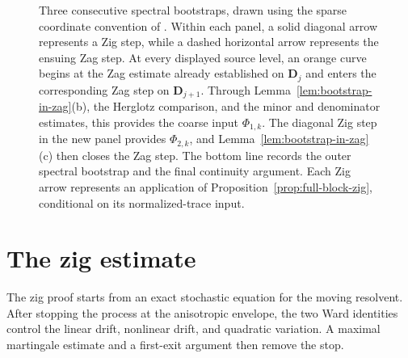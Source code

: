 \documentclass[11pt,reqno]{amsart}
\def\bD{\mathbf{D}}
\theoremstyle{definition}
\numberwithin{equation}{section}
\numberwithin{figure}{section}
\begin{document}
\begin{figure}[t]
\caption{Three consecutive spectral bootstraps, drawn using the sparse coordinate convention of \cite[Figure~1]{erdos2025lecture}. Within each panel, a solid diagonal arrow represents a Zig step, while a dashed horizontal arrow represents the ensuing Zag step. At every displayed source level, an orange curve begins at the Zag estimate already established on $\bD_j$ and enters the corresponding Zag step on $\bD_{j+1}$. Through Lemma~\ref{lem:bootstrap-in-zag}(b), the Herglotz comparison, and the minor and denominator estimates, this provides the coarse input $\Phi_{1,k}$. The diagonal Zig step in the new panel provides $\Phi_{2,k}$, and Lemma~\ref{lem:bootstrap-in-zag}(c) then closes the Zag step. The bottom line records the outer spectral bootstrap and the final continuity argument. Each Zig arrow represents an application of Proposition~\ref{prop:full-block-zig}, conditional on its normalized-trace input.}
\label{fig:proof-strategy}
\end{figure}

\section{The zig estimate}\label{sec:zig}
The zig proof starts from an exact stochastic equation for the moving
resolvent.  After stopping the process at the anisotropic envelope, the two Ward
identities control the linear drift, nonlinear drift, and quadratic
variation.  A maximal martingale estimate and a first-exit argument then remove the stop.
\end{document}

